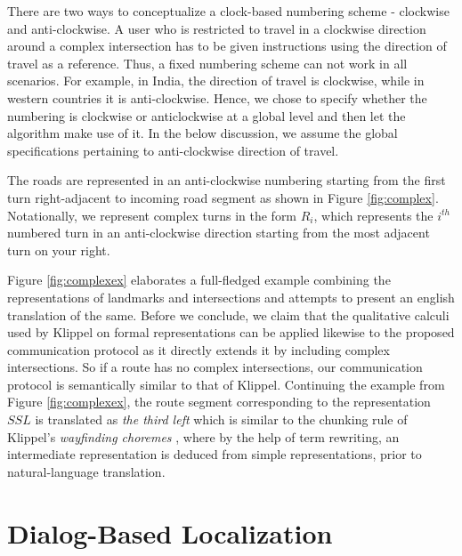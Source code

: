 \documentclass{iitkthesis}
\begin{document}
There are two ways to conceptualize a clock-based numbering scheme - clockwise and anti-clockwise. A user who is restricted to travel in a clockwise direction around a complex intersection has to be given instructions using the direction of travel as a reference. Thus, a fixed numbering scheme can not work in all scenarios. For example, in India, the direction of travel is clockwise, while in western countries it is anti-clockwise. Hence, we chose to specify whether the numbering is clockwise or anticlockwise at a global level and then let the algorithm make use of it. In the below discussion, we assume the global specifications pertaining to anti-clockwise direction of travel.

The roads are represented in an anti-clockwise numbering starting from the first turn right-adjacent to 
incoming road segment as shown in Figure \ref{fig:complex}. Notationally, 
we represent complex turns in the form $R_i$, which represents the 
$i^{th}$ numbered turn in an anti-clockwise direction starting from the most 
adjacent turn on your right.

Figure \ref{fig:complexex} elaborates a full-fledged example combining 
the representations of landmarks and intersections and attempts to 
present an english translation of the same. Before we conclude, we claim 
that the qualitative calculi used by Klippel \cite{klippel} on formal 
representations can be applied likewise to the proposed communication 
protocol as it directly extends it by including 
complex intersections. So if a route has no complex intersections, our 
communication protocol is semantically similar to that of Klippel. 
Continuing the example from Figure \ref{fig:complexex}, the route 
segment corresponding to the representation $SSL$ is translated as 
\textit{the third left} which is similar to the chunking rule of 
Klippel's \textit{wayfinding choremes} \cite{klippel}, where by the help 
of term rewriting, an intermediate representation is deduced from simple 
representations, prior to natural-language translation.

 \chapter{Dialog-Based Localization}
\end{document}
